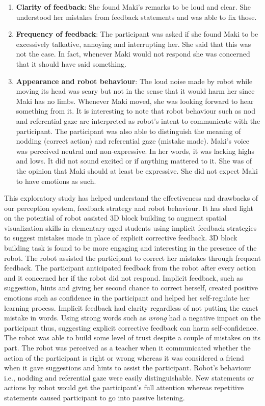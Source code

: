 \begin{enumerate}
    \item \textbf{Clarity of feedback}: She found Maki's remarks to be loud and clear. She understood her mistakes from feedback statements and was able to fix those.
    \item \textbf{Frequency of feedback}: The participant was asked if she found Maki to be excessively talkative, annoying and interrupting her. She said that this was not the case. In fact, whenever Maki would not respond she was concerned that it should have said something. 
    \item \textbf{Appearance and robot behaviour}: The loud noise made by robot while moving its head was scary but not in the sense that it would harm her since Maki has no limbs. Whenever Maki moved, she was looking forward to hear something from it. It is interesting to note that robot behaviour such as nod and referential gaze are interpreted as robot's intent to communicate with the participant. The participant was also able to distinguish the meaning of nodding (correct action) and referential gaze (mistake made). Maki's voice was perceived neutral and non-expressive. In her words, it was lacking highs and lows. It did not sound excited or if anything mattered to it. She was of the opinion that Maki should at least be expressive. She did not expect Maki to have emotions as such. 
\end{enumerate}
This exploratory study has helped understand the effectiveness and drawbacks of our perception system, feedback strategy and robot behaviour. It has shed light on the potential of robot assisted 3D block building to augment spatial visualization skills in elementary-aged students using implicit feedback strategies to suggest mistakes made in place of explicit corrective feedback. 3D block building task is found to be more engaging and interesting in the presence of the robot. The robot assisted the participant to correct her mistakes through frequent feedback. The participant anticipated feedback from the robot after every action and it concerned her if the robot did not respond. Implicit feedback, such as suggestion, hints and giving her second chance to correct herself, created positive emotions such as confidence in the participant and helped her self-regulate her learning process. Implicit feedback had clarity regardless of not putting the exact mistake in words. Using strong words such as \emph{wrong} had a negative impact on the participant thus, suggesting explicit corrective feedback can harm self-confidence. The robot was able to build some level of trust despite a couple of mistakes on its part. The robot was perceived as a teacher when it communicated whether the action of the participant is right or wrong whereas it was considered a friend when it gave suggestions and hints to assist the participant. Robot's behaviour i.e., nodding and referential gaze were easily distinguishable. New statements or actions by robot would get the participant's full attention whereas repetitive statements caused participant to go into passive listening.\\
